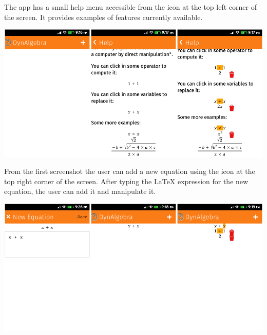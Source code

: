 The app has a small help menu accessible from the icon at the top left corner
of the screen. It provides examples of features currently available.

\href{http://r-gaia-cs.github.io/DynAlgebra/}{\includegraphics[width=\textwidth]{screenshots/10-dynalgebra-A.png}}

From the first screenshot the user can add a new equation using the icon at the
top right corner of the screen. After typing the LaTeX expression for the new
equation, the user can add it and manipulate it.

\href{http://r-gaia-cs.github.io/DynAlgebra/}{\includegraphics[width=\textwidth]{screenshots/10-dynalgebra-B.png}}
